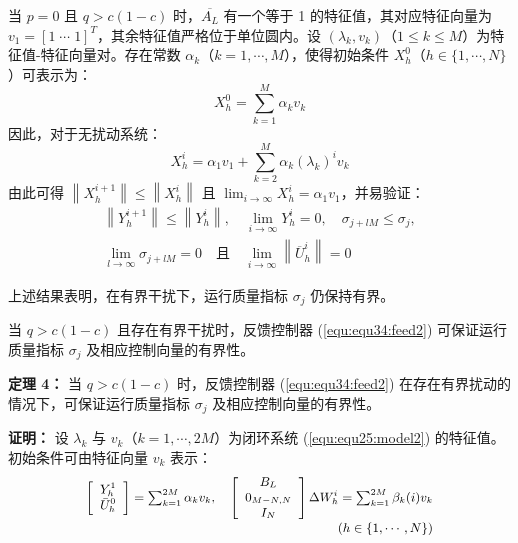 当 $p=0$ 且 $q>c(1-c)$ 时，$\overline{A_L}$ 有一个等于 1 的特征值，其对应特征向量为 $v_{1}=[1 \; \cdots \; 1]^{T}$，其余特征值严格位于单位圆内。设 $(\lambda_{k}, v_{k})$（$1 \leq k \leq M$）为特征值-特征向量对。存在常数 $\alpha_{k}$（$k=1,\cdots, M$），使得初始条件 $X_{h}^{0}$（$h \in\{1, \cdots, N\}$）可表示为：
\begin{equation*}
	X_{h}^{0}=\sum_{k=1}^{M} \alpha_{k} v_{k}
\end{equation*}
因此，对于无扰动系统：
\begin{equation*}
	X_{h}^{i}=\alpha_{1} v_{1}+\sum_{k=2}^{M} \alpha_{k}\left(\lambda_{k}\right)^{i} v_{k}
\end{equation*}
由此可得 $\left\|X_{h}^{i+1}\right\| \leq\left\|X_{h}^{i}\right\|$ 且 $\lim _{i \rightarrow \infty} X_{h}^{i}=\alpha_{1} v_{1}$，并易验证：
\begin{equation*}
	\begin{gathered}
		\left\|Y_{h}^{i+1}\right\| \leq\left\|Y_{h}^{i}\right\|, \quad \lim _{i \rightarrow \infty} Y_{h}^{i}=0, \quad \sigma_{j+l M} \leq \sigma_{j}, \\
		\lim _{l \rightarrow \infty} \sigma_{j+l M}=0 \quad \text{且} \quad \lim _{i \rightarrow \infty}\left\|\overline{U}_{h}^{i}\right\|=0
	\end{gathered}
\end{equation*}

上述结果表明，在有界干扰下，运行质量指标 $\sigma_{j}$ 仍保持有界。

当 $q>c(1-c)$ 且存在有界干扰时，反馈控制器 (\ref{equ:equ34:feed2}) 可保证运行质量指标 $\sigma_{j}$ 及相应控制向量的有界性。

\textbf{定理 4：} 当 $q>c(1-c)$ 时，反馈控制器 (\ref{equ:equ34:feed2}) 在存在有界扰动的情况下，可保证运行质量指标 $\sigma_{j}$ 及相应控制向量的有界性。

\textbf{证明：} 设 $\lambda_k$ 与 $v_k$（$k=1,\cdots,2M$）为闭环系统 (\ref{equ:equ25:model2}) 的特征值。初始条件可由特征向量 $v_k$ 表示：
\begin{equation*}
	\small
	\begin{array}{r}
		\left[\begin{array}{c}
			Y_{h}^{1} \\
			\bar{U}_{h}^{0}
		\end{array}\right]=\sum_{k=1}^{2 M} \alpha_{k} v_{k}, \quad
		\left[\begin{array}{c}
			B_{L} \\
			0_{M-N, N} \\
			I_{N}
		\end{array}\right] \Delta W_{h}^{i}=\sum_{k=1}^{2 M} \beta_{k}(i) v_{k} \\
		(h \in\{1, \cdots, N\})
	\end{array}
\end{equation*}

